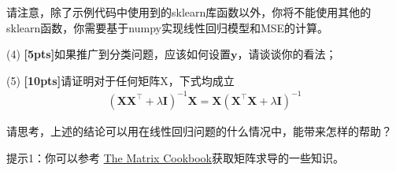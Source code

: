 \documentclass[a4paper,UTF8]{article}
\theoremstyle{definition}
\begin{document}
请注意，除了示例代码中使用到的sklearn库函数以外，你将不能使用其他的sklearn函数，你需要基于numpy实现线性回归模型和MSE的计算。



(4) \textbf{[5pts]}如果推广到分类问题，应该如何设置$\mathbf{y}$，请谈谈你的看法；

(5) \textbf{[10pts]}请证明对于任何矩阵X，下式均成立
\begin{align}
	\left(\mathbf{X X}^{\top}+\lambda \mathbf{I}\right)^{-1} \mathbf{X}=\mathbf{X}\left(\mathbf{X}^{\top} \mathbf{X}+\lambda \mathbf{I}\right)^{-1}
\end{align}

请思考，上述的结论可以用在线性回归问题的什么情况中，能带来怎样的帮助？

提示1：你可以参考 \href{https://www.math.uwaterloo.ca/~hwolkowi/matrixcookbook.pdf}{The Matrix Cookbook}获取矩阵求导的一些知识。
\end{document}
